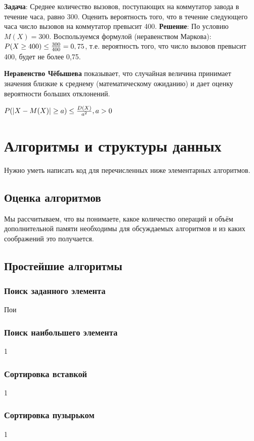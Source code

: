 \documentclass[12pt]{matmex-diploma}
\begin{document}
            \textbf{Задача}: Среднее количество вызовов, поступающих на коммутатор завода в течение часа, равно 300. Оценить вероятность того, что в течение следующего часа число вызовов на коммутатор превысит 400.
            \textbf{Решение}: По условию $M(X) = 300$. Воспользуемся формулой (неравенством Маркова): $P(X \geq 400) \leq {300\over{400}} = 0,75$, т.е. вероятность того, что число вызовов превысит 400, будет не более 0,75.
            
            \textbf{Неравенство Чёбышева} показывает, что случайная величина принимает значения близкие к среднему (математическому ожиданию) и дает оценку вероятности больших отклонений.
            
            $P(|X-M(X)| \geq a) \leq {D(X)\over{a^{2}}}, a>0$
            
\section{Алгоритмы и структуры данных}

    Нужно уметь написать код для перечисленных ниже элементарных алгоритмов.

    \subsection{Оценка алгоритмов}
    
        Мы рассчитываем, что вы понимаете, какое количество операций и объём дополнительной памяти необходимы для обсуждаемых алгоритмов и из каких соображений это получается.
    
    \subsection{Простейшие алгоритмы}
    
        \subsubsection*{Поиск заданного элемента}
            Пои
        \subsubsection*{Поиск наибольшего элемента}
            1
        \subsubsection*{Сортировка вставкой}
            1
        \subsubsection*{Сортировка пузырьком}
            1
\end{document}
